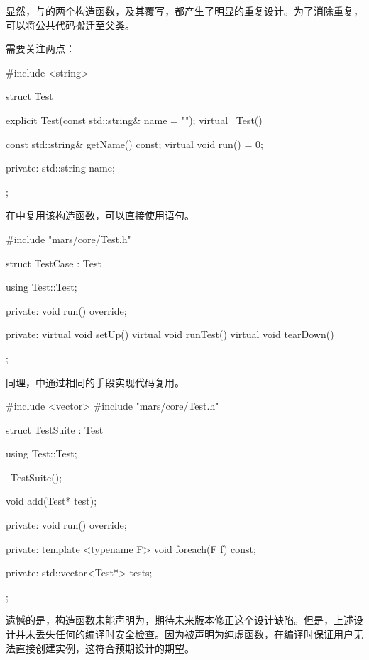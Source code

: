 \begin{content}
显然，与的两个构造函数，及其覆写，都产生了明显的重复设计。为了消除重复，可以将公共代码搬迁至父类。

需要关注两点：

\begin{enum}
\end{enum}

\begin{leftbar}
 \begin{c++}[caption={\ttfamily{include/mars/core/Test.h}}]
#include <string>

struct Test {
  explicit Test(const std::string& name = "");
  virtual ~Test() {}

  const std::string& getName() const;
  virtual void run() = 0;

private:
  std::string name;
};
 \end{c++}
\end{leftbar}

在中复用该构造函数，可以直接使用语句。

\begin{leftbar}
 \begin{c++}[caption={\ttfamily{include/mars/core/TestCase.h}}]
#include "mars/core/Test.h"

struct TestCase : Test {
  using Test::Test;

private:
  void run() override;

private:
  virtual void setUp() {}
  virtual void runTest() {}
  virtual void tearDown() {}
};
 \end{c++}
\end{leftbar}

同理，中通过相同的手段实现代码复用。

\begin{leftbar}
 \begin{c++}[caption={\ttfamily{include/mars/core/TestSuite.h}}]
#include <vector>
#include "mars/core/Test.h"

struct TestSuite : Test {
  using Test::Test;

  ~TestSuite();

  void add(Test* test);

private:
  void run() override;

private:
  template <typename F>
  void foreach(F f) const;

private:
  std::vector<Test*> tests;
};
 \end{c++}
\end{leftbar}

遗憾的是，构造函数未能声明为，期待未来版本修正这个设计缺陷。但是，上述设计并未丢失任何的编译时安全检查。因为被声明为纯虚函数，在编译时保证用户无法直接创建实例，这符合预期设计的期望。

\end{content}

